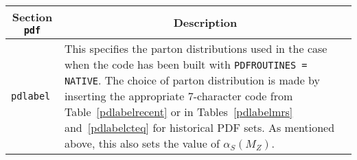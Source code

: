 	\begin{longtable}{p{1.5cm}p{12cm}}
		\hline
		\multicolumn{1}{c}{{\textbf{Section} \texttt{pdf}}} & \multicolumn{1}{c}{{\textbf{Description}}} \\ 
		\hline
		\texttt{pdlabel} &
		This specifies the parton distributions used in the case when the code has been built with
		\texttt{PDFROUTINES = NATIVE}. The choice of parton distribution is made by
		inserting the appropriate 7-character code from Table~\ref{pdlabelrecent}
		or in Tables~\ref{pdlabelmrs} and~\ref{pdlabelcteq} for historical PDF sets.
		As mentioned above, this also sets the value of $\alpha_S(M_Z)$.\\
		\hline
	\end{longtable}

